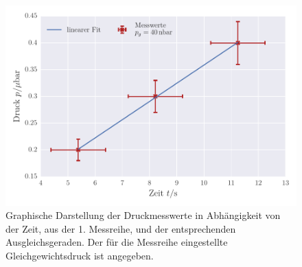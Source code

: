 \begin{figure}[!h]
 \centering \includegraphics[scale=0.8]{../Grafiken/Leckrate_Turbo_0.pdf}                                                          
 \caption{Graphische Darstellung der Druckmesswerte in Abhängigkeit von der Zeit, aus der 1. Messreihe, und der
 	entsprechenden Ausgleichsgeraden. Der für die Messreihe eingestellte Gleichgewichtsdruck ist angegeben. \label{fig:leckrate_turbo_0}}
 \end{figure} 